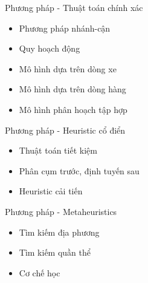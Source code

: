 \begin{frame}{Phương pháp - Thuật toán chính xác}
  \begin{itemize}
    \item Phương pháp nhánh-cận
    \item Quy hoạch động
    \item Mô hình dựa trên dòng xe 
    \item Mô hình dựa trên dòng hàng
    \item Mô hình phân hoạch tập hợp
  \end{itemize}
\end{frame}

\begin{frame}{Phương pháp - Heuristic cổ điển}
  \begin{itemize}
    \item Thuật toán tiết kiệm
    \item Phân cụm trước, định tuyến sau 
    \item Heuristic cải tiến
  \end{itemize}
\end{frame}

\begin{frame}{Phương pháp - Metaheuristics}
  \begin{itemize}
    \item Tìm kiếm địa phương
    \item Tìm kiếm quần thể 
    \item Cơ chế học
  \end{itemize}
\end{frame}

